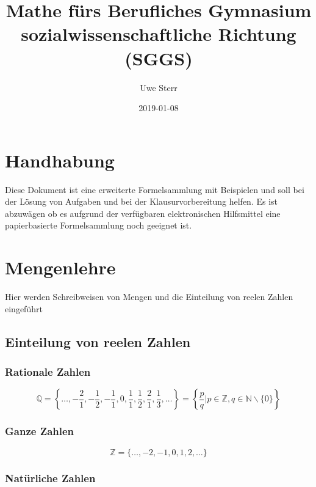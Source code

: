 \documentclass[]{book}
\title{Mathe fürs Berufliches Gymnasium sozialwissenschaftliche Richtung (SGGS)}
\author{Uwe Sterr}
\date{2019-01-08}
\begin{document}
\maketitle

{
\setcounter{tocdepth}{1}
\tableofcontents
}
\chapter{Handhabung}\label{handhabung}

Diese Dokument ist eine erweiterte Formelsammlung mit Beispielen und
soll bei der Lösung von Aufgaben und bei der Klausurvorbereitung helfen.
Es ist abzuwägen ob es aufgrund der verfügbaren elektronischen
Hilfsmittel eine papierbasierte Formelsammlung noch geeignet ist.

\chapter{Mengenlehre}\label{intro}

Hier werden Schreibweisen von Mengen und die Einteilung von reelen
Zahlen eingeführt

\section{Einteilung von reelen
Zahlen}\label{einteilung-von-reelen-zahlen}

\subsection{Rationale Zahlen}\label{rationale-zahlen}

\[\mathbb { Q } = \left\{ \ldots , - \frac { 2 } { 1 } , - \frac { 1 } { 2 } , - \frac { 1 } { 1 } , 0 , \frac { 1 } { 1 } , \frac { 1 } { 2 } , \frac { 2 } { 1 } , \frac { 1 } { 3 } , \ldots \right\} = \left\{ \frac { p } { q } | p \in \mathbb { Z } , q \in \mathbb { N } \backslash \{ 0 \} \right\}\]

\subsection{Ganze Zahlen}\label{ganze-zahlen}

\[\mathbb { Z } = \{ \ldots , - 2 , - 1,0,1,2 , \ldots \}\]

\subsection{Natürliche Zahlen}\label{naturliche-zahlen}
\end{document}
